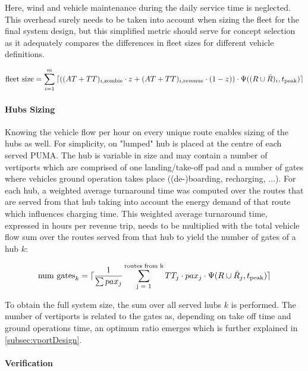Here, wind and vehicle maintenance during the daily service time is neglected. This overhead surely needs to be taken into account when sizing the fleet for the final system design, but this simplified metric should serve for concept selection as it adequately compares the differences in fleet sizes for different vehicle definitions.

\begin{align} \label{eq:fleetsize}
    \text{fleet size} = \sum_{i=1}^m { \lceil \left( (AT + TT)_{i, \text{zombie}} \cdot z + (AT + TT)_{i, \text{revenue}} \cdot (1-z) \right) \cdot \Psi((R\cup\bar{R})_i, t_{\text{peak}}) \rceil }
\end{align}


\paragraph{Hubs Sizing}

Knowing the vehicle flow per hour on every unique route enables sizing of the hubs as well. For simplicity, on "lumped" hub is placed at the centre of each served PUMA. The hub is variable in size and may contain a number of vertiports which are comprised of one landing/take-off pad and a number of gates where vehicles ground operation takes place ((de-)boarding, recharging, ...). For each hub, a weighted average turnaround time was computed over the routes that are served from that hub taking into account the energy demand of that route which influences charging time. This weighted average turnaround time, expressed in hours per revenue trip, needs to be multiplied with the total vehicle flow sum over the routes served from that hub to yield the number of gates of a hub $k$:

\begin{align}
    \text{num gates}_k = \lceil \frac{1}{\sum{pax_j}} \sum_{\text{j = 1}}^{\text{routes from k}} {TT_j \cdot pax_j \cdot \Psi(R\cup\bar{R}_j, t_{\text{peak}})} \rceil
\end{align}

To obtain the full system size, the sum over all served hubs $k$ is performed. The number of vertiports is related to the gates as, depending on take off time and ground operations time, an optimum ratio emerges which is further explained in \autoref{subsec:vportDesign}.



\paragraph{Verification}

